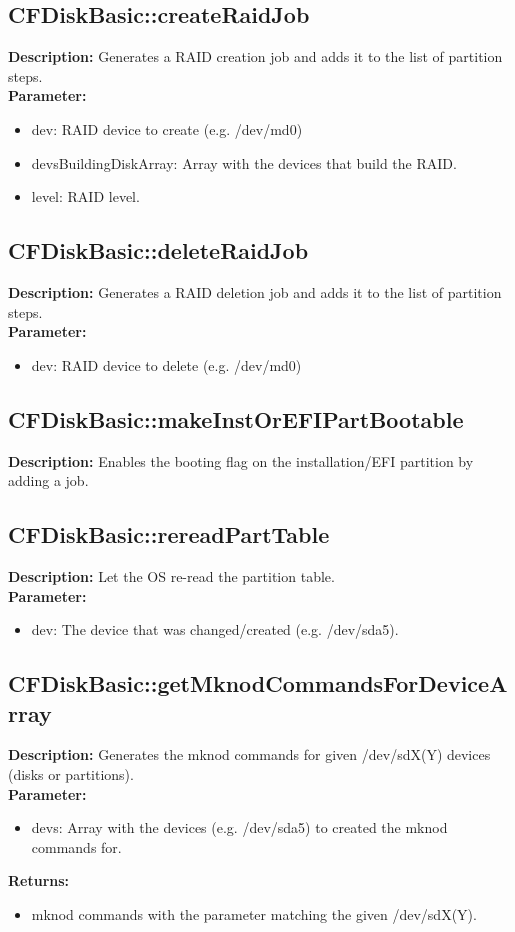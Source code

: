 \subsection{CFDiskBasic::createRaidJob}
\textbf{Description:} Generates a RAID creation job and adds it to the list of partition steps.\\
\textbf{Parameter:}
\begin{itemize}
\item dev: RAID device to create (e.g. /dev/md0)
\item devsBuildingDiskArray: Array with the devices that build the RAID.
\item level: RAID level.
\end{itemize}

\subsection{CFDiskBasic::deleteRaidJob}
\textbf{Description:} Generates a RAID deletion job and adds it to the list of partition steps.\\
\textbf{Parameter:}
\begin{itemize}
\item dev: RAID device to delete (e.g. /dev/md0)
\end{itemize}

\subsection{CFDiskBasic::makeInstOrEFIPartBootable}
\textbf{Description:} Enables the booting flag on the installation/EFI partition by adding a job.\\

\subsection{CFDiskBasic::rereadPartTable}
\textbf{Description:} Let the OS re-read the partition table.\\
\textbf{Parameter:}
\begin{itemize}
\item dev: The device that was changed/created (e.g. /dev/sda5).
\end{itemize}

\subsection{CFDiskBasic::getMknodCommandsForDeviceArray}
\textbf{Description:} Generates the mknod commands for given /dev/sdX(Y) devices (disks or partitions).\\
\textbf{Parameter:}
\begin{itemize}
\item devs: Array with the devices (e.g. /dev/sda5) to created the mknod commands for.
\end{itemize}
\textbf{Returns:}
\begin{itemize}
\item mknod commands with the parameter matching the given /dev/sdX(Y).
\end{itemize}

